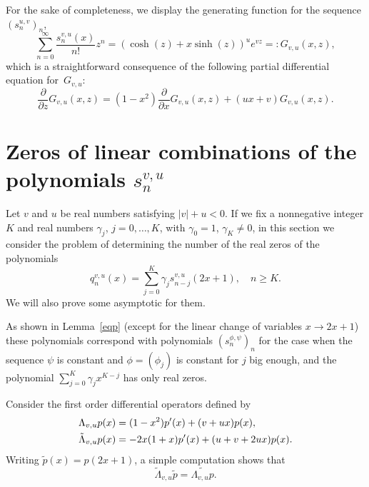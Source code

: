 \documentclass[10pt, a4paper, leqno]{amsart}
\numberwithin{equation}{section}
\theoremstyle{plain}
\theoremstyle{remark}
\newcommand{\spp}{s^{\phi,\psi}}
\newcommand{\scvu}{s^{v,u}}
\begin{document}
For the sake of completeness, we display the generating function for the sequence $(s_n^{u,v})_n$,
\[
  \sum_{n=0}^\infty \frac{\scvu_n(x)}{n!} z^n 
  = (\cosh(z)+x\sinh(z))^u e^{vz} =: G_{v,u}(x,z),
\]
which is a straightforward consequence of the following partial differential equation for~$G_{v,u}$:
\[
  \frac{\partial}{\partial z} G_{v,u}(x,z)
  = (1-x^2)\frac{\partial}{\partial x} G_{v,u}(x,z) + (ux+v) G_{v,u}(x,z).
\]

\section{Zeros of linear combinations of the polynomials \texorpdfstring{$\scvu_n$}{snvu}}
\label{sec6}

Let $v$ and $u$ be real numbers satisfying $|v|+u<0$. If we fix a nonnegative integer $K$ and real numbers $\gamma_j$, $j=0,\dots, K$, with $\gamma_0=1$, $\gamma_K \ne 0$, in this section we consider the problem of determining the number of the real zeros of the polynomials
\begin{equation}
\label{polqn}
  q_n^{v,u}(x) = \sum_{j=0}^K \gamma_j \scvu_{n-j}(2x+1),\quad n\ge K.
\end{equation}
We will also prove some asymptotic for them.

As shown in Lemma~\ref{eqp} (except for the linear change of variables $x\to 2x+1$) these polynomials correspond with polynomials $(\spp_n)_n$ for the case when the sequence $\psi$ is constant and $\phi=(\phi_j)$ is constant for $j$ big enough, and the polynomial $\sum_{j=0}^K \gamma_j x^{K-j}$ has only real zeros.

Consider the first order differential operators defined by
\begin{align}
\notag
  \Lambda_{v,u} p(x)& = (1-x^2)p'(x) + (v+ux)p(x), \\
\label{tguv}
  \tilde \Lambda_{v,u} p(x)& = -2x(1+x)p'(x) + (u+v+2ux)p(x).
\end{align}
Writing $\tilde p(x)=p(2x+1)$, a simple computation shows that
\begin{equation}
\label{cuy1}
  \tilde \Lambda_{v,u}\tilde p=\widetilde{\Lambda_{v,u} p}.
\end{equation}
\end{document}
